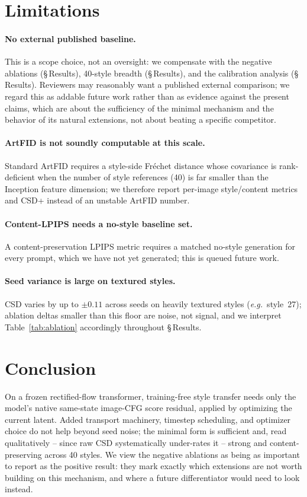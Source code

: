 \documentclass[letterpaper]{article} %
\newcommand{\eg}{\emph{e.g.}}
\begin{document}
\section{Limitations}

\paragraph{No external published baseline.} This is a scope choice, not an
oversight: we compensate with the negative ablations (\S\,Results), 40-style
breadth (\S\,Results), and the calibration analysis (\S\,Results). Reviewers
may reasonably want a published external comparison; we regard this as
addable future work rather than as evidence against the present claims, which
are about the sufficiency of the minimal mechanism and the behavior of its
natural extensions, not about beating a specific competitor.

\paragraph{ArtFID is not soundly computable at this scale.} Standard ArtFID
requires a style-side Fr\'echet distance whose covariance is rank-deficient
when the number of style references (40) is far smaller than the Inception
feature dimension; we therefore report per-image style/content metrics and
CSD+ instead of an unstable ArtFID number.

\paragraph{Content-LPIPS needs a no-style baseline set.} A content-preservation
LPIPS metric requires a matched no-style generation for every prompt, which we
have not yet generated; this is queued future work.

\paragraph{Seed variance is large on textured styles.} CSD varies by up to
$\pm0.11$ across seeds on heavily textured styles (\eg\ style~27); ablation
deltas smaller than this floor are noise, not signal, and we interpret
Table~\ref{tab:ablation} accordingly throughout \S\,Results.

\section{Conclusion}

On a frozen rectified-flow transformer, training-free style transfer needs
only the model's native same-state image-CFG score residual, applied by
optimizing the current latent. Added transport machinery, timestep scheduling,
and optimizer choice do not help beyond seed noise; the minimal form is
sufficient and, read qualitatively -- since raw CSD systematically under-rates
it -- strong and content-preserving across 40 styles. We view the negative
ablations as being as important to report as the positive result: they mark
exactly which extensions are not worth building on this mechanism, and where a
future differentiator would need to look instead.


\end{document}
